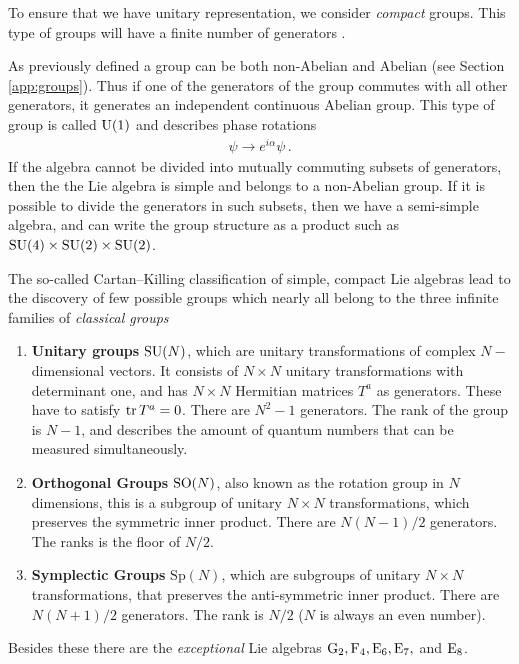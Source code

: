 To ensure that we have unitary representation, we consider \textit{compact} groups. This type of groups will have a finite number of generators \cite{Peskin:1995ev}.

As previously defined a group can be both non-Abelian and Abelian (see Section \ref{app:groups}). Thus if one of the generators of the group commutes with all other generators, it generates an independent continuous Abelian group. This type of group is called $\mathrm{U}(1)$ and describes phase rotations 
\begin{align}
    \psi\to e^{i\alpha}\psi\,.
\end{align}
If the algebra cannot be divided into mutually commuting subsets of generators, then the the Lie algebra is simple and belongs to a non-Abelian group. If it is possible to divide the generators in such subsets, then we have a semi-simple algebra, and can write the group structure as a product such as $\mathrm{SU}(4)\times\mathrm{SU}(2)\times\mathrm{SU}(2)$.  

The so-called Cartan--Killing classification of simple, compact Lie algebras lead to the discovery of few possible groups which nearly all belong to the three infinite families of \textit{classical groups} \cite{Peskin:1995ev}
\begin{enumerate}
    \item \textbf{Unitary groups } $\mathrm{SU}(N)$, which are unitary transformations of complex $N-$dimensional vectors. It consists of $N\times N$ unitary transformations with determinant one, and has $N\times N$ Hermitian matrices $T^a$ as generators. These have to satisfy $\operatorname{tr} T^a=0$. There are $N^2-1$ generators. The rank of the group is $N-1$, and describes the amount of quantum numbers that can be measured simultaneously.  
    \item \textbf{Orthogonal Groups } $\mathrm{SO}(N)$, also known as the rotation group in $N$ dimensions, this is a subgroup of unitary $N\times N$ transformations, which preserves the symmetric inner product. There are $N(N-1)/2$ generators. The ranks is the floor of $N/2$.
    \item \textbf{Symplectic Groups } $\mathrm{Sp}(N)$, which are subgroups of unitary $N\times N$ transformations, that preserves the anti-symmetric inner product. There are $N(N+1)/2$ generators. The rank is $N/2$ ($N$ is always an even number).
\end{enumerate}
Besides these there are the \textit{exceptional} Lie algebras $\mathrm{G}_2, \mathrm{F}_4, \mathrm{E}_6, \mathrm{E}_7,$ and $\mathrm{E}_8$. 

